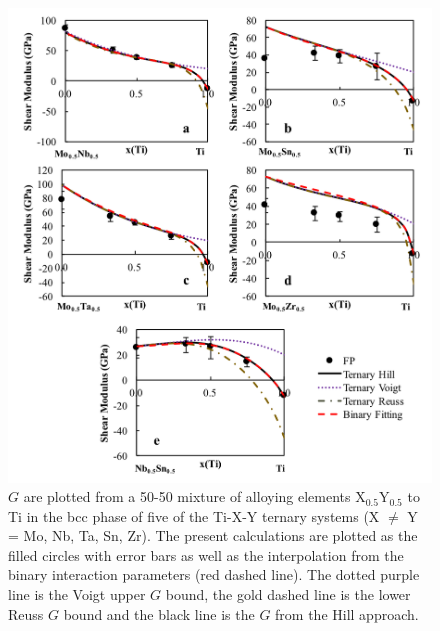 \pagebreak
\begin{figure}[H]
	\centering
	\includegraphics[width=\textwidth]{Chapter-6/Figures/tixyshear1.png}
	\caption{$G$ are plotted from a 50-50 mixture of alloying elements X$_{0.5}$Y$_{0.5}$ to Ti in the bcc phase of five of the Ti-X-Y ternary systems (X $\neq$ Y = Mo, Nb, Ta, Sn, Zr). The present calculations are plotted as the filled circles with error bars as well as the interpolation from the binary interaction parameters (red dashed line). The dotted purple line is the Voigt upper $G$ bound, the gold dashed line is the lower Reuss $G$ bound and the black line is the $G$ from the Hill approach.}
	\label{Ch6-figure:tixyshear1}
\end{figure}

